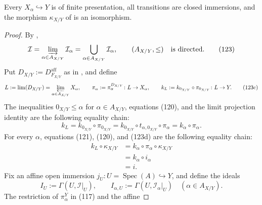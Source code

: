 \begin{lemma}
  \label{lemma:nagata-closed-subscheme-fp-system}

  Every $X_\alpha\hookrightarrow Y$ is of finite presentation, all
  transitions are closed immersions, and the morphism
  $\kappa_{X/Y}$ of  is an
  isomorphism.
\end{lemma}

\begin{proof}
  By \cite[\href{https://stacks.math.columbia.edu/tag/09ZP}{Tag 09ZP}]
  {stacks-project},
  \[
    \mathcal I=\varinjlim_{\alpha\in A_{X/Y}}\mathcal I_\alpha
      =\bigcup_{\alpha\in A_{X/Y}}\mathcal I_\alpha,
    \qquad
    (A_{X/Y},\leq)\quad\text{is directed}.                     \tag{123}
  \]
  Put $D_{X/Y}:=D_{F_{X/Y}}^{\mathrm{aff}}$ as in
  , and define
  \[
    L:=\lim(D_{X/Y})=\varprojlim_{\alpha\in A_{X/Y}}X_\alpha,\qquad
    \pi_\alpha:=\pi_\alpha^{D_{X/Y}}\colon L\to X_\alpha,\qquad
    k_L:=k_{0_{X/Y}}\circ\pi_{0_{X/Y}}\colon L\to Y.             \tag{123c}
  \]
  The inequalities $0_{X/Y}\leq\alpha$ for
  $\alpha\in A_{X/Y}$, equations (120), and the limit projection identity
  are the following equality chain:
  \[
    k_L
      =k_{0_{X/Y}}\circ\pi_{0_{X/Y}}
      =k_{0_{X/Y}}\circ t_{\alpha,0_{X/Y}}\circ\pi_\alpha
      =k_\alpha\circ\pi_\alpha.                                  \tag{123d}
  \]
  For every $\alpha$, equations (121), (120), and (123d) are the following
  equality chain:
  \[
  \begin{aligned}
    k_L\circ\kappa_{X/Y}
      &=k_\alpha\circ\pi_\alpha\circ\kappa_{X/Y}\\
      &=k_\alpha\circ i_\alpha\\
      &=i.
  \end{aligned}                                                   \tag{123e}
  \]
  Fix an affine open immersion $j_U\colon U=\operatorname{Spec}(A)\hookrightarrow
  Y$, and define the ideals
  \[
    I_U:=\Gamma(U,\mathcal I|_U),
    \qquad
    I_{\alpha,U}:=\Gamma(U,\mathcal I_\alpha|_U)
      \quad(\alpha\in A_{X/Y}).                                  \tag{123a}
  \]
  The restriction of $\pi_\alpha^Y$ in (117) and the affine

\end{proof}
